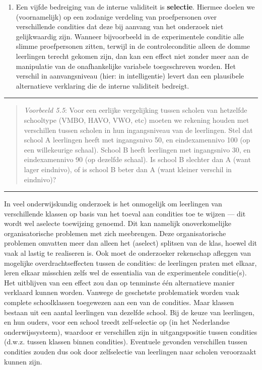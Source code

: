 \documentclass[
]{book}
\providecommand{\tightlist}{%
  \setlength{\itemsep}{0pt}\setlength{\parskip}{0pt}}
\begin{document}
\begin{enumerate}
\def\labelenumi{\arabic{enumi}.}
\setcounter{enumi}{4}
\tightlist
\item
  Een vijfde bedreiging van de interne validiteit is \textbf{selectie}.
  Hiermee doelen we (voornamelijk) op een
  zodanige verdeling van proefpersonen over verschillende condities dat
  deze bij aanvang van het onderzoek niet gelijkwaardig zijn. Wanneer
  bijvoorbeeld in de experimentele conditie alle slimme proefpersonen
  zitten, terwijl in de controleconditie alleen de domme leerlingen
  terecht gekomen zijn, dan kan een effect niet zonder meer aan de
  manipulatie van de onafhankelijke variabele toegeschreven worden. Het
  verschil in aanvangsniveau (hier: in intelligentie) levert dan een
  plausibele alternatieve verklaring die de interne validiteit bedreigt.
\end{enumerate}

\begin{center}\rule{0.5\linewidth}{0.5pt}\end{center}

\begin{quote}
\emph{Voorbeeld 5.5}: Voor een eerlijke vergelijking tussen scholen van hetzelfde schooltype
(VMBO, HAVO, VWO, etc) moeten we rekening houden met verschillen tussen
scholen in hun ingangsniveau van de leerlingen. Stel dat school A
leerlingen heeft met ingangsnivo 50, en eindexamennivo 100 (op een
willekeurige schaal). School B heeft leerlingen met ingangsnivo 30, en
eindexamennivo 90 (op dezelfde schaal). Is school B slechter dan A (want
lager eindnivo), of is school B beter dan A (want kleiner verschil in
eindnivo)?
\end{quote}

\begin{center}\rule{0.5\linewidth}{0.5pt}\end{center}

In veel onderwijskundig onderzoek is het onmogelijk om leerlingen van
verschillende klassen op basis van het toeval aan condities toe te
wijzen --- dit wordt wel aselecte toewijzing genoemd. Dit kan namelijk
onoverkomelijke organisatorische problemen met zich meebrengen. Deze
organisatorische problemen omvatten meer dan alleen het (aselect)
splitsen van de klas, hoewel dit vaak al lastig te realiseren is. Ook
moet de onderzoeker rekenschap afleggen van mogelijke
overdrachtseffecten tussen de condities: de leerlingen praten met
elkaar, leren elkaar misschien zelfs wel de essentialia van de
experimentele conditie(s). Het uitblijven van een effect zou dan op
tenminste één alternatieve manier verklaard kunnen worden. Vanwege de
geschetste problematiek worden vaak complete schoolklassen toegewezen
aan een van de condities. Maar klassen bestaan uit een aantal leerlingen
van dezelfde school. Bij de keuze van leerlingen, en hun ouders, voor
een school treedt zelf-selectie op (in het Nederlandse
onderwijssysteem), waardoor er verschillen zijn in uitgangspositie
tussen condities (d.w.z. tussen klassen binnen condities). Eventuele
gevonden verschillen tussen condities zouden dus ook door zelfselectie
van leerlingen naar scholen veroorzaakt kunnen zijn.
\end{document}
